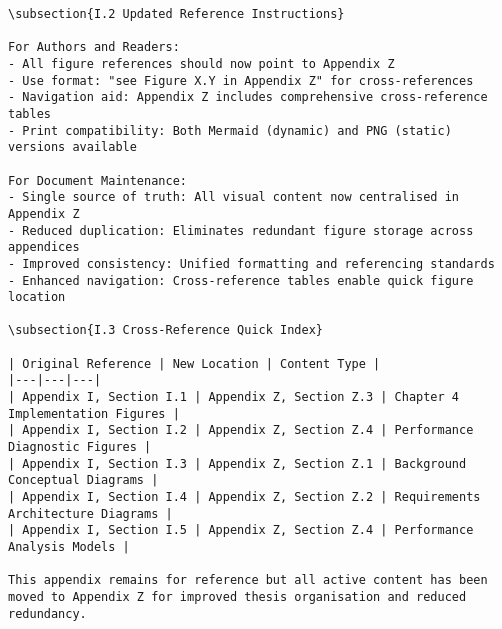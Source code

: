 \begin{verbatim}
\subsection{I.2 Updated Reference Instructions}

For Authors and Readers:
- All figure references should now point to Appendix Z
- Use format: "see Figure X.Y in Appendix Z" for cross-references
- Navigation aid: Appendix Z includes comprehensive cross-reference tables
- Print compatibility: Both Mermaid (dynamic) and PNG (static) versions available

For Document Maintenance:
- Single source of truth: All visual content now centralised in Appendix Z
- Reduced duplication: Eliminates redundant figure storage across appendices
- Improved consistency: Unified formatting and referencing standards
- Enhanced navigation: Cross-reference tables enable quick figure location

\subsection{I.3 Cross-Reference Quick Index}

| Original Reference | New Location | Content Type |
|---|---|---|
| Appendix I, Section I.1 | Appendix Z, Section Z.3 | Chapter 4 Implementation Figures |
| Appendix I, Section I.2 | Appendix Z, Section Z.4 | Performance Diagnostic Figures |
| Appendix I, Section I.3 | Appendix Z, Section Z.1 | Background Conceptual Diagrams |
| Appendix I, Section I.4 | Appendix Z, Section Z.2 | Requirements Architecture Diagrams |
| Appendix I, Section I.5 | Appendix Z, Section Z.4 | Performance Analysis Models |

This appendix remains for reference but all active content has been moved to Appendix Z for improved thesis organisation and reduced redundancy.
\end{verbatim}
